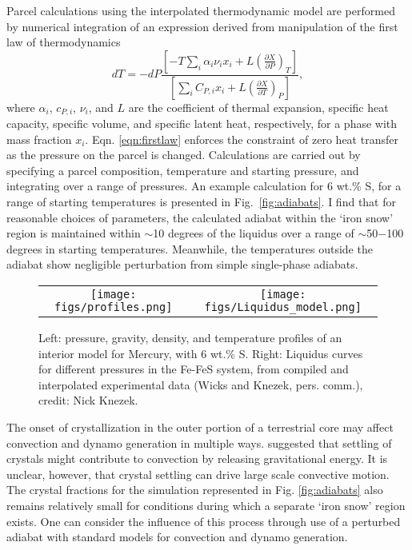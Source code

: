 Parcel calculations using the interpolated thermodynamic model are performed
by numerical integration of an expression derived from manipulation of the
first law of thermodynamics
%
\begin{equation}
  \label{eqn:firstlaw}
  d T = -d P \frac{\left[-T \sum_i \alpha_i\nu_ix_i +
    L\left(\frac{\partial{X}}{\partial{P}}\right)_T \right] } 
  {\left[ \sum_i C_{P,i}x_i + L \left(
    \frac{\partial{X}}{\partial{T}}\right)_P \right] },
\end{equation}
%
where $\alpha_i$, $c_{P,i}$, $\nu_i$, and $L$ are the coefficient of thermal
expansion, specific heat capacity, specific volume, and specific latent heat,
respectively, for a phase with mass fraction $x_i$. Eqn. \ref{eqn:firstlaw}
enforces the constraint of zero heat transfer as the pressure on the parcel is
changed. Calculations are carried out by specifying a parcel composition,
temperature and starting pressure, and integrating over a range of pressures.
An example calculation for 6 wt.\% S, for a range of starting temperatures is
presented in Fig.~\ref{fig:adiabats}. I find that for reasonable choices of
parameters, the calculated adiabat within the `iron snow' region is maintained
within $\sim$10 degrees of the liquidus over a range of $\sim$50$-$100 degrees
in starting temperatures. Meanwhile, the temperatures outside the adiabat show
negligible perturbation from simple single-phase adiabats.

 \begin{figure}[h] %
   \centering
\begin{tabular}{cc}
 \texttt{[image: figs/profiles.png]} &
 \texttt{[image: figs/Liquidus\_model.png]} \\
\end{tabular}
   \caption{ Left: pressure, gravity, density, and temperature profiles of an
interior model for Mercury, with 6 wt.\% S.  Right: Liquidus curves for different
pressures in the Fe-FeS system, from compiled and interpolated experimental data
(Wicks and Knezek, pers. comm.), credit: Nick Knezek.}
  \label{fig:interior_model}
\end{figure}


The onset of crystallization in the outer portion of a terrestrial core may
affect convection and dynamo generation in multiple ways. 
\citet{Hauck2006} suggested that settling of crystals might contribute to
convection by releasing gravitational energy. It is unclear, however, that
crystal settling can drive large scale convective motion. The crystal fractions
for the simulation represented in Fig. \ref{fig:adiabats} also remains
relatively small for conditions during which a separate `iron snow' region
exists. One can consider the influence of this process through use of a
perturbed adiabat with standard models for convection and dynamo generation.

